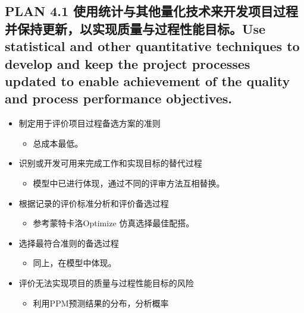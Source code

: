 \hypertarget{plan-4.1-ux4f7fux7528ux7edfux8ba1ux4e0eux5176ux4ed6ux91cfux5316ux6280ux672fux6765ux5f00ux53d1ux9879ux76eeux8fc7ux7a0bux5e76ux4fddux6301ux66f4ux65b0ux4ee5ux5b9eux73b0ux8d28ux91cfux4e0eux8fc7ux7a0bux6027ux80fdux76eeux6807use-statistical-and-other-quantitative-techniques-to-develop-and-keep-the-project-processes-updated-to-enable-achievement-of-the-quality-and-process-performance-objectives.}{%
\subsection{PLAN 4.1
使用统计与其他量化技术来开发项目过程并保持更新，以实现质量与过程性能目标。Use
statistical and other quantitative techniques to develop and keep the
project processes updated to enable achievement of the quality and
process performance
objectives.}\label{plan-4.1-ux4f7fux7528ux7edfux8ba1ux4e0eux5176ux4ed6ux91cfux5316ux6280ux672fux6765ux5f00ux53d1ux9879ux76eeux8fc7ux7a0bux5e76ux4fddux6301ux66f4ux65b0ux4ee5ux5b9eux73b0ux8d28ux91cfux4e0eux8fc7ux7a0bux6027ux80fdux76eeux6807use-statistical-and-other-quantitative-techniques-to-develop-and-keep-the-project-processes-updated-to-enable-achievement-of-the-quality-and-process-performance-objectives.}}

\begin{itemize}
\tightlist
\item
  制定用于评价项目过程备选方案的准则

  \begin{itemize}
  \tightlist
  \item
    总成本最低。
  \end{itemize}
\item
  识别或开发可用来完成工作和实现目标的替代过程

  \begin{itemize}
  \tightlist
  \item
    模型中已进行体现，通过不同的评审方法互相替换。
  \end{itemize}
\item
  根据记录的评价标准分析和评价备选过程

  \begin{itemize}
  \tightlist
  \item
    参考蒙特卡洛Optimize 仿真选择最佳配搭。
  \end{itemize}
\item
  选择最符合准则的备选过程

  \begin{itemize}
  \tightlist
  \item
    同上，在模型中体现。
  \end{itemize}
\item
  评价无法实现项目的质量与过程性能目标的风险

  \begin{itemize}
  \tightlist
  \item
    利用PPM预测结果的分布，分析概率
  \end{itemize}
\end{itemize}


